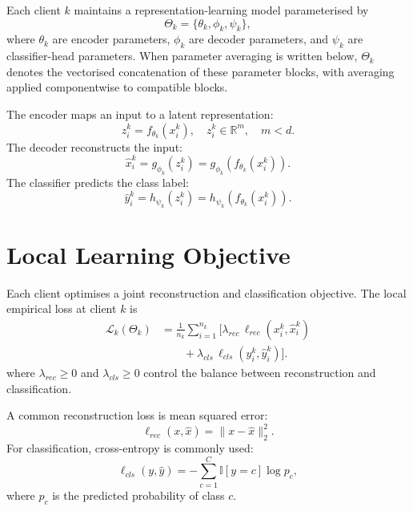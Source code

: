 \documentclass[conference]{IEEEtran}
\newcommand{\rev}[1]{#1}
\begin{document}
Each client \(k\) maintains a representation-learning model parameterised by
\begin{equation*}
    \Theta_k = \{\theta_k,\phi_k,\psi_k\},
\end{equation*}
where \(\theta_k\) are encoder parameters, \(\phi_k\) are decoder parameters, and \(\psi_k\) are classifier-head parameters. \rev{When parameter averaging is written below, \(\Theta_k\) denotes the vectorised concatenation of these parameter blocks, with averaging applied componentwise to compatible blocks.}

The encoder maps an input to a latent representation:
\begin{equation*}
    z_i^k = f_{\theta_k}(x_i^k), \quad z_i^k \in \mathbb{R}^{m}, \quad m < d.
\end{equation*}
The decoder reconstructs the input:
\begin{equation*}
    \hat{x}_i^k = g_{\phi_k}(z_i^k)=g_{\phi_k}(f_{\theta_k}(x_i^k)).
\end{equation*}
The classifier predicts the class label:
\begin{equation*}
    \hat{y}_i^k = h_{\psi_k}(z_i^k)=h_{\psi_k}(f_{\theta_k}(x_i^k)).
\end{equation*}

\section{Local Learning Objective}
\label{sec:local-learning-objective}

Each client optimises a joint reconstruction and classification objective. The local empirical loss at client \(k\) is
\begin{equation}
\begin{aligned}
\mathcal{L}_k(\Theta_k)
&=\frac{1}{n_k}\sum_{i=1}^{n_k}
\Big[
\lambda_{rec}\,\ell_{rec}(x_i^k,\hat{x}_i^k)\\
&\qquad+\lambda_{cls}\,\ell_{cls}(y_i^k,\hat{y}_i^k)
\Big].
\end{aligned}
\label{eq:local_loss}
\end{equation}
where \(\lambda_{rec}\geq0\) and \(\lambda_{cls}\geq0\) control the balance between reconstruction and classification.

A common reconstruction loss is mean squared error:
\begin{equation*}
    \ell_{rec}(x,\hat{x}) = \|x-\hat{x}\|_2^2.
\end{equation*}
For classification, cross-entropy is commonly used:
\begin{equation*}
    \ell_{cls}(y,\hat{y}) = -\sum_{c=1}^{C} \mathbb{I}[y=c]\log p_c,
\end{equation*}
where \(p_c\) is the predicted probability of class \(c\).
\end{document}
